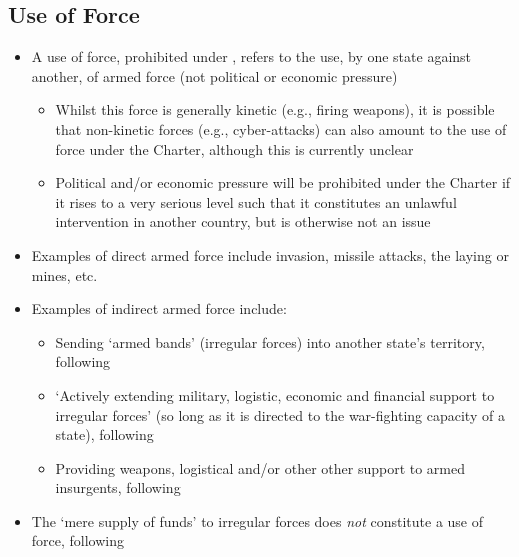 \subsection{Use of Force}
\begin{itemize}
    \item A use of force, prohibited under , refers to the use, by one state against another, of armed force (not political or economic pressure)
    \begin{itemize}
        \item Whilst this force is generally kinetic (e.g., firing weapons), it is possible that non-kinetic forces (e.g., cyber-attacks) can also amount to the use of force under the Charter, although this is currently unclear
        \item Political and/or economic pressure will be prohibited under the Charter if it rises to a very serious level such that it constitutes an unlawful intervention in another country, but is otherwise not an issue
    \end{itemize}
    \item Examples of direct armed force include invasion, missile attacks, the laying or mines, etc.
    \item Examples of indirect armed force include:
    \begin{itemize}
        \item Sending `armed bands' (irregular forces) into another state's territory, following 
        \item `Actively extending military, logistic, economic and financial support to irregular forces' (so long as it is directed to the war-fighting capacity of a state), following 
        \item Providing weapons, logistical and/or other other support to armed insurgents, following 
    \end{itemize}
    \item The `mere supply of funds' to irregular forces does \textit{not} constitute a use of force, following 
\end{itemize}

